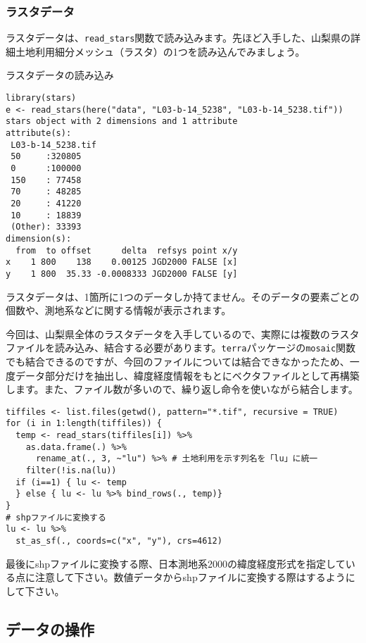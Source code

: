   \subsubsection{ラスタデータ}
ラスタデータは、\verb|read_stars|関数で読み込みます。先ほど入手した、山梨県の詳細土地利用細分メッシュ（ラスタ）の1つを読み込んでみましょう。
\begin{itembox}[l]{ラスタデータの読み込み}
\begin{verbatim}
library(stars)
e <- read_stars(here("data", "L03-b-14_5238", "L03-b-14_5238.tif"))
stars object with 2 dimensions and 1 attribute
attribute(s):
 L03-b-14_5238.tif 
 50     :320805    
 0      :100000    
 150    : 77458    
 70     : 48285    
 20     : 41220    
 10     : 18839    
 (Other): 33393    
dimension(s):
  from  to offset      delta  refsys point x/y
x    1 800    138    0.00125 JGD2000 FALSE [x]
y    1 800  35.33 -0.0008333 JGD2000 FALSE [y]
\end{verbatim}
\end{itembox}
ラスタデータは、1箇所に1つのデータしか持てません。そのデータの要素ごとの個数や、測地系などに関する情報が表示されます。

今回は、山梨県全体のラスタデータを入手しているので、実際には複数のラスタファイルを読み込み、結合する必要があります。\verb|terra|パッケージの\verb|mosaic|関数でも結合できるのですが、今回のファイルについては結合できなかったため、一度データ部分だけを抽出し、緯度経度情報をもとにベクタファイルとして再構築します。また、ファイル数が多いので、繰り返し命令を使いながら結合します。
\begin{verbatim}
tiffiles <- list.files(getwd(), pattern="*.tif", recursive = TRUE)
for (i in 1:length(tiffiles)) {
  temp <- read_stars(tiffiles[i]) %>%
    as.data.frame(.) %>%
	  rename_at(., 3, ~"lu") %>% # 土地利用を示す列名を「lu」に統一
    filter(!is.na(lu))
  if (i==1) { lu <- temp
  } else { lu <- lu %>% bind_rows(., temp)}
}
# shpファイルに変換する
lu <- lu %>%
  st_as_sf(., coords=c("x", "y"), crs=4612)
\end{verbatim}
最後にshpファイルに変換する際、日本測地系2000の緯度経度形式を指定している点に注意して下さい。数値データからshpファイルに変換する際はするようにして下さい。

  \subsection{データの操作}

